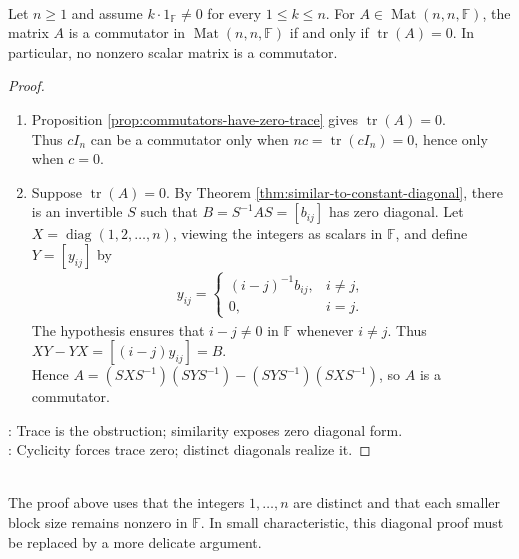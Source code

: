 \begin{theorem} \label{thm:shoda-trace-zero-commutators} \\
Let $n\geq1$ and assume $k\cdot1_{\mathbb{F}}\neq0$ for every $1\leq k\leq n$. For $A\in\operatorname{Mat}(n,n,\mathbb{F})$, the matrix $A$ is a commutator in $\operatorname{Mat}(n,n,\mathbb{F})$ if and only if $\operatorname{tr}(A)=0$. In particular, no nonzero scalar matrix is a commutator.
\begin{proof}
\begin{enumerate}[label=\roman*.]
\setlength{\itemsep}{0pt}
\item[$(\Rightarrow)$] Proposition \ref{prop:commutators-have-zero-trace} gives $\operatorname{tr}(A)=0$.\\
Thus $cI_n$ can be a commutator only when $nc=\operatorname{tr}(cI_n)=0$, hence only when $c=0$.
\item[$(\Leftarrow)$] Suppose $\operatorname{tr}(A)=0$. By Theorem \ref{thm:similar-to-constant-diagonal}, there is an invertible $S$ such that $B=S^{-1}AS=[b_{ij}]$ has zero diagonal. Let $X=\operatorname{diag}(1,2,\ldots,n)$, viewing the integers as scalars in $\mathbb{F}$, and define $Y=[y_{ij}]$ by
\begin{align}
y_{ij}=
\begin{cases}
(i-j)^{-1}b_{ij}, & i\neq j,\\
0, & i=j.
\end{cases}
\nonumber
\end{align}
The hypothesis ensures that $i-j\neq0$ in $\mathbb{F}$ whenever $i\neq j$. Thus $XY-YX=[(i-j)y_{ij}]=B$.\\
Hence $A=(SXS^{-1})(SYS^{-1})-(SYS^{-1})(SXS^{-1})$, so $A$ is a commutator.
\end{enumerate}
: Trace is the obstruction; similarity exposes zero diagonal form.\\
: Cyclicity forces trace zero; distinct diagonals realize it.
\end{proof}
\end{theorem}

\begin{remark} \label{rem:shoda-field-hypothesis} \\
The proof above uses that the integers $1,\ldots,n$ are distinct and that each smaller block size remains nonzero in $\mathbb{F}$. In small characteristic, this diagonal proof must be replaced by a more delicate argument.
\end{remark}

